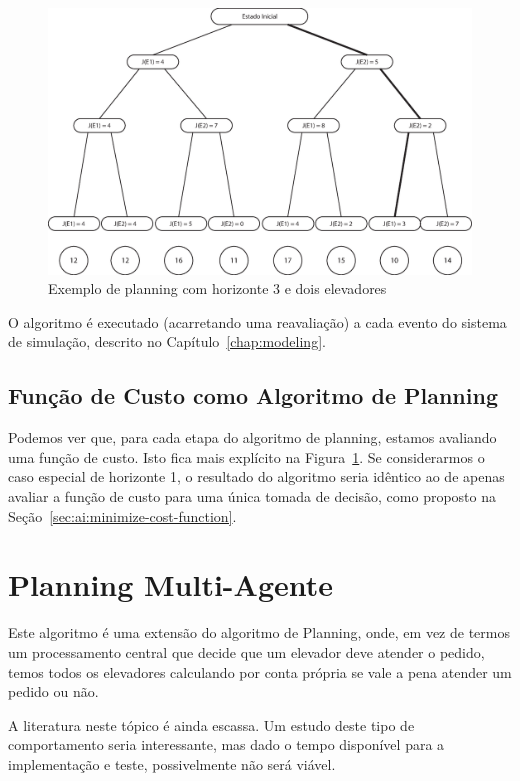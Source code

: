 \begin{figure}[htb!]
  \centering
  \includegraphics[scale=0.6]{img/planning.eps}
  \caption{Exemplo de planning com horizonte 3 e dois elevadores}
\label{fig:planning}
\end{figure}

O algoritmo é executado (acarretando uma reavaliação) a cada evento do sistema
de simulação, descrito no Capítulo~\ref{chap:modeling}.

\subsection{Função de Custo como Algoritmo de Planning}

Podemos ver que, para cada etapa do algoritmo de planning, estamos avaliando uma
função de custo. Isto fica mais explícito na Figura~\ref{fig:planning}. Se
considerarmos o caso especial de horizonte 1, o resultado do algoritmo seria
idêntico ao de apenas avaliar a função de custo para uma única tomada de
decisão, como proposto na Seção~\ref{sec:ai:minimize-cost-function}.

\section{Planning Multi-Agente}

Este algoritmo é uma extensão do algoritmo de Planning, onde, em vez de termos
um processamento central que decide que um elevador deve atender o pedido, temos
todos os elevadores calculando por conta própria se vale a pena atender um
pedido ou não.

A literatura neste tópico é ainda escassa. Um estudo deste tipo de
comportamento seria interessante, mas dado o tempo disponível para a
implementação e teste, possivelmente não será viável.


